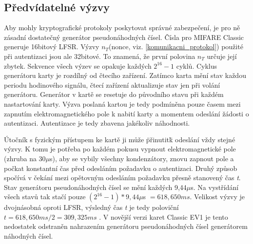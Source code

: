 \subsection{Předvídatelné výzvy}
\label{predvidatelne_nonce}
Aby mohly kryptografické protokoly poskytovat správné zabezpečení, je pro ně zásadní dostatečný generátor pseudonáhodných čísel. Čísla pro MIFARE Classic generuje 16bitový LFSR. Výzvy $n_T$(nonce, viz. \ref{komunikacni_protokol}) použité při autentizaci jsou ale 32bitové. To znamená, že první polovina $n_T$ určuje její zbytek. Sekvence všech výzev se opakuje každých $2^{16} - 1$ cyklů\cite{Cryptanalisis}. Cyklus generátoru karty je rozdílný od čtecího zařízení. Zatímco karta mění stav každou periodu hodinového signálu, čtecí zařízení aktualizuje stav jen při volání generátoru\cite{Dismantling_Mifare_Classic}. Generátor v kartě se resetuje do původního stavu při každém nastartování karty. Výzva poslaná kartou je tedy podmíněna pouze časem mezi zapnutím elektromagnetického pole k nabití karty a momentem odeslání žádosti o autentizaci. Autentizace je tedy zbavena jakékoliv náhodnosti. \par
Útočník s fyzickým přístupem ke kartě ji může \"přinutit\" k odeslání vždy stejné výzvy. K tomu je potřeba po každém pokusu vypnout elektromagnetické pole (zhruba na 30$\mu$s), aby se vybily všechny kondenzátory, znovu zapnout pole a počkat konstantní čas před odesláním požadavku o autentizaci. Druhý způsob spočívá v čekání mezi opětovným odesláním požadavku přesně stanovený čas \emph{t}. Stav generátoru pseudonáhodných čísel se mění každých 9,44$\mu$s. Na vystřídání všech stavů tak stačí pouze $(2^{16} - 1) * 9,44\mu$s $= 618,650ms$. Velikost výzvy je dvojnásobná oproti LFSR, výsledný čas \emph{t} je tedy poloviční $t = 618,650ms/2 = 309,325ms$ \cite{Wirelessly_Pickpocketing}. V novější verzi karet Classic EV1 je tento nedostatek odstraněn nahrazením generátoru pseudonáhodných čísel generátorem náhodných čísel\cite{MIFARE_Classic_Official_about}.

